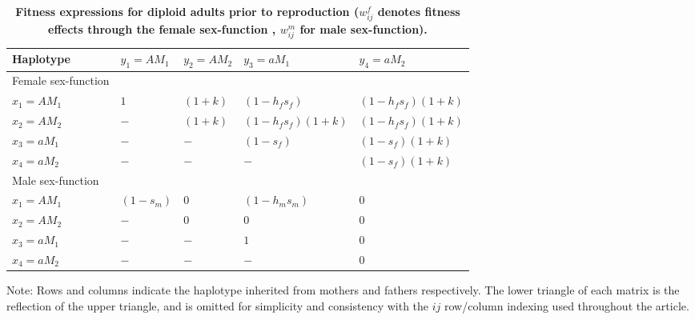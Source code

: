 \documentclass[9pt,twocolumn,twoside,lineno]{gsajnl}
\begin{document}
\begin{table*}[htbp]
\centering
\caption{\bf Fitness expressions for diploid adults prior to reproduction ($w^f_{ij}$ denotes fitness effects through the female sex-function , $w^m_{ij}$ for male sex-function).}
\begin{tableminipage}{\textwidth}
\begin{tabularx}{\textwidth}{XXXXX}
\hline
Haplotype & $y_1 = AM_1$ & $y_2 = AM_2$ & $y_3 = aM_1$ & $y_4 = aM_2$ \\
\hline
Female sex-function & & & & \\
$x_1 = AM_1$ & $1$ & $(1 + k)$ & $(1 - h_f s_f)$        & $(1 - h_f s_f)(1 + k)$ \\
$x_2 = AM_2$ & $-$ & $(1 + k)$ & $(1 - h_f s_f)(1 + k)$ & $(1 - h_f s_f)(1 + k)$ \\
$x_3 = aM_1$ & $-$ & $-$       & $(1 - s_f)$            & $(1 - s_f)(1 + k)$ \\
$x_4 = aM_2$ & $-$ & $-$       & $-$                    & $(1 - s_f)(1 + k)$ \\
Male sex-function & & & & \\
$x_1 = AM_1$ & $(1 - s_m)$ & $0$ & $(1 - h_m s_m)$ & $0$ \\
$x_2 = AM_2$ & $-$         & $0$ & $0$             & $0$ \\
$x_3 = aM_1$ & $-$         & $-$ & $1$             & $0$ \\
$x_4 = aM_2$ & $-$         & $-$ & $-$             & $0$ \\
\hline
\end{tabularx}
  \label{tab:fitness}
\end{tableminipage}
{\footnotesize Note: Rows and columns indicate the haplotype inherited from mothers and fathers respectively. The lower triangle of each matrix is the reflection of the upper triangle, and is omitted for simplicity and consistency with the $ij$ row/column indexing used throughout the article.}
\end{table*}
\end{document}

